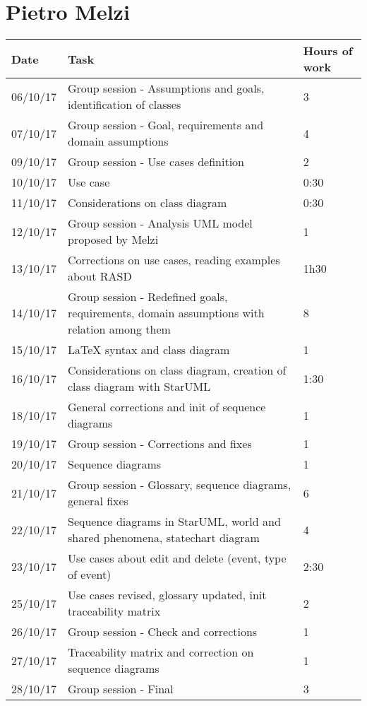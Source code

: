 \section{Pietro Melzi}
\begin{table}[H]
	\begin{tabular}{ p{2cm} p{8cm} p{3cm}}
	Date & Task & Hours of work\\
	\hline
	06/10/17 & Group session - Assumptions and goals, identification of classes & 3 \\
	07/10/17 & Group session - Goal, requirements and domain assumptions & 4 \\
	09/10/17 & Group session - Use cases definition & 2 \\
	10/10/17 & Use case & 0:30 \\
	11/10/17 & Considerations on class diagram & 0:30 \\
	12/10/17 & Group session - Analysis UML model proposed by Melzi & 1 \\
	13/10/17 & Corrections on use cases, reading examples about RASD & 1h30 \\ 
	14/10/17 & Group session - Redefined goals, requirements, domain assumptions with relation among them & 8 \\
	15/10/17 & LaTeX syntax and class diagram & 1 \\
	16/10/17 & Considerations on class diagram, creation of class diagram with StarUML & 1:30 \\
	18/10/17 & General corrections and init of sequence diagrams & 1 \\
	19/10/17 & Group session - Corrections and fixes & 1 \\
	20/10/17 & Sequence diagrams & 1 \\
	21/10/17 & Group session - Glossary, sequence diagrams, general fixes & 6 \\
	22/10/17 & Sequence diagrams in StarUML, world and shared phenomena, statechart diagram & 4 \\
	23/10/17 & Use cases about edit and delete (event, type of event) & 2:30 \\
	25/10/17 & Use cases revised, glossary updated, init traceability matrix & 2 \\
	26/10/17 & Group session - Check and corrections & 1 \\
	27/10/17 & Traceability matrix and correction on sequence diagrams & 1 \\
	28/10/17 & Group session - Final & 3 \\
	\end{tabular}
\end{table}

